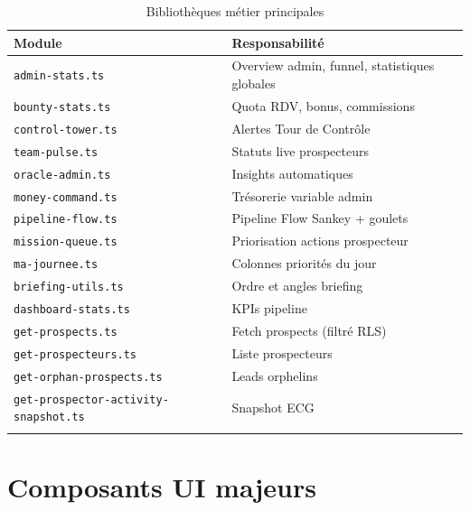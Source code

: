 \documentclass[11pt,a4paper]{report}
\begin{document}
\begin{longtable}{@{}p{4.5cm}p{9.5cm}@{}}
\toprule
\textbf{Module} & \textbf{Responsabilité} \\
\midrule
\endhead
\texttt{admin-stats.ts} & Overview admin, funnel, statistiques globales \\
\texttt{bounty-stats.ts} & Quota RDV, bonus, commissions \\
\texttt{control-tower.ts} & Alertes Tour de Contrôle \\
\texttt{team-pulse.ts} & Statuts live prospecteurs \\
\texttt{oracle-admin.ts} & Insights automatiques \\
\texttt{money-command.ts} & Trésorerie variable admin \\
\texttt{pipeline-flow.ts} & Pipeline Flow Sankey + goulets \\
\texttt{mission-queue.ts} & Priorisation actions prospecteur \\
\texttt{ma-journee.ts} & Colonnes priorités du jour \\
\texttt{briefing-utils.ts} & Ordre et angles briefing \\
\texttt{dashboard-stats.ts} & KPIs pipeline \\
\texttt{get-prospects.ts} & Fetch prospects (filtré RLS) \\
\texttt{get-prospecteurs.ts} & Liste prospecteurs \\
\texttt{get-orphan-prospects.ts} & Leads orphelins \\
\texttt{get-prospector-activity-snapshot.ts} & Snapshot ECG \\
\bottomrule
\caption{Bibliothèques métier principales}
\end{longtable}

\chapter{Composants UI majeurs}
\end{document}
